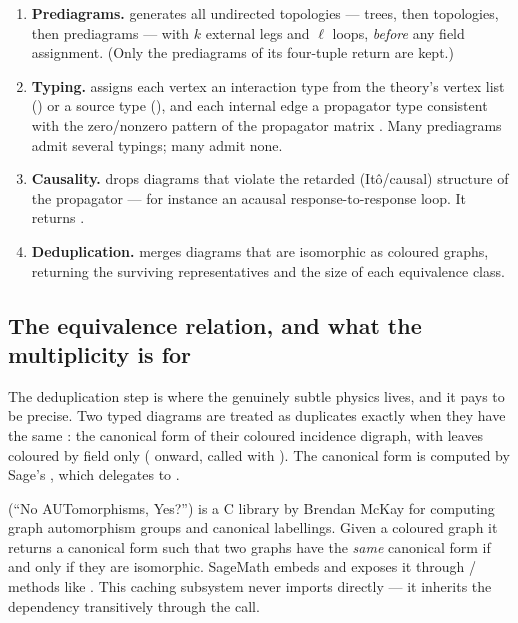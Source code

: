 \begin{enumerate}
  \item \textbf{Prediagrams.} 
        generates all undirected topologies --- trees, then topologies, then
        prediagrams --- with $k$ external legs and $\ell$ loops, \emph{before}
        any field assignment. (Only the prediagrams of its four-tuple return are
        kept.)
  \item \textbf{Typing.}  assigns each vertex an
        interaction type from the theory's vertex list () or a
        source type (), and each internal edge a propagator type
        consistent with the zero/nonzero pattern of the propagator matrix
        . Many prediagrams admit several typings; many admit none.
  \item \textbf{Causality.}  drops diagrams that violate
        the retarded (It\^o/causal) structure of the \msrjd{} propagator --- for
        instance an acausal response-to-response loop. It returns
        .
  \item \textbf{Deduplication.}  merges
        diagrams that are isomorphic as coloured graphs, returning the surviving
        representatives and the size of each equivalence class.
\end{enumerate}

\subsection{The equivalence relation, and what the multiplicity is for}

The deduplication step is where the genuinely subtle physics lives, and it pays
to be precise. Two typed diagrams are treated as duplicates exactly when they
have the same : the canonical form of their coloured
incidence digraph, with leaves coloured by field only
( onward, called with
). The canonical form is computed by Sage's
, which delegates to
.

\begin{note}
 (``No AUTomorphisms, Yes?'') is a C library by Brendan McKay for
computing graph automorphism groups and canonical labellings. Given a coloured
graph it returns a canonical form such that two graphs have the \emph{same}
canonical form if and only if they are isomorphic. SageMath embeds 
and exposes it through / methods like
. This caching subsystem never imports 
directly --- it inherits the dependency transitively through the
 call.
\end{note}

